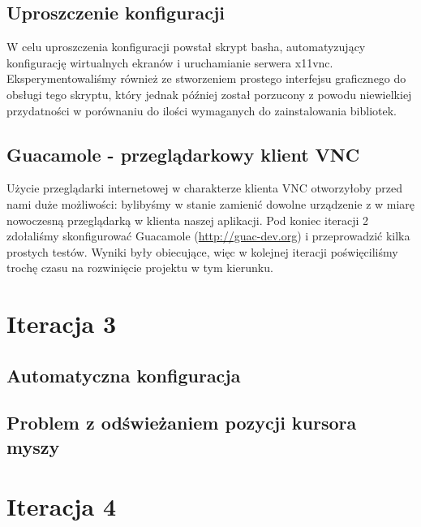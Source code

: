   \subsection{Uproszczenie konfiguracji}

    W celu uproszczenia konfiguracji powstał skrypt basha, automatyzujący konfigurację wirtualnych ekranów i uruchamianie serwera x11vnc. Eksperymentowaliśmy również ze stworzeniem prostego interfejsu graficznego do obsługi tego skryptu, który jednak później został porzucony z powodu niewielkiej przydatności w porównaniu do ilości wymaganych do zainstalowania bibliotek.


  \subsection{Guacamole - przeglądarkowy klient VNC}

    Użycie przeglądarki internetowej w charakterze klienta VNC otworzyłoby przed nami duże możliwości: bylibyśmy w stanie zamienić dowolne urządzenie z w miarę nowoczesną przeglądarką w klienta naszej aplikacji. Pod koniec iteracji 2 zdołaliśmy skonfigurować Guacamole (\url{http://guac-dev.org}) i przeprowadzić kilka prostych testów. Wyniki były obiecujące, więc w kolejnej iteracji poświęciliśmy trochę czasu na rozwinięcie projektu w tym kierunku.

    \vfill
    \pagebreak

\section{Iteracja 3}

  \subsection{Automatyczna konfiguracja}

  \subsection{Problem z odświeżaniem pozycji kursora myszy}

\section{Iteracja 4}


